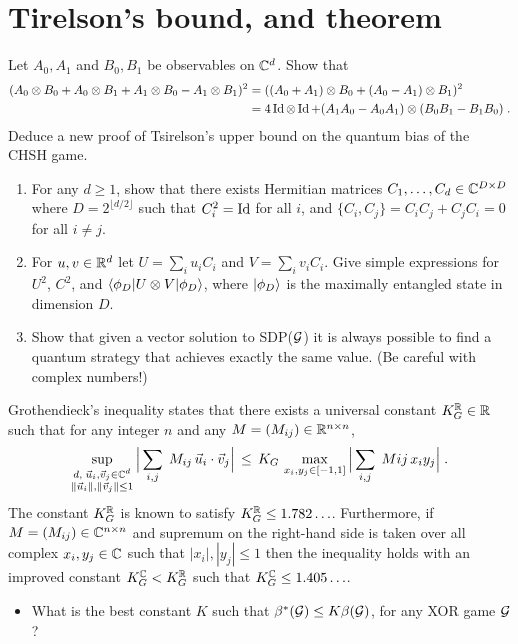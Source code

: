 \section{Tirelson's bound, and theorem}


\begin{exercise}
Let $A_0,A_1$ and $B_0,B_1$ be observables on $\mathbb{C}^d$. Show that
\begin{align}
(A_0\otimes B_0 + A_0\otimes B_1 + A_1\otimes B_0 - A_1\otimes B_1 )^2 &=( (A_0+A_1)\otimes B_0 + (A_0-A_1)\otimes B_1 )^2\label{eq:bellop}\\
&= 4\mathop{\rm Id}\nolimits\otimes \mathop{\rm Id}\nolimits + (A_1A_0-A_0A_1)\otimes (B_0B_1-B_1B_0)\;.\notag
\end{align}
Deduce a new proof of Tsirelson's upper bound on the quantum bias of the CHSH game. 
\end{exercise}

\begin{exercise}\label{ex:tsirelson}
\begin{enumerate}
\item For any $d\geq 1$, show that there exists Hermitian matrices $C_1,\ldots,C_d \in \mathbb{C}^{D\times D}$ where $D=2^{\lfloor d/2\rfloor}$ such that $C_i^2=\mathop{\rm Id}\nolimits$ for all $i$, and $\{C_i,C_j\}=C_iC_j+C_jC_i=0$ for all $i\neq j$.
\item For $u,v \in \mathbb{R}^d$ let $U = \sum_i u_i C_i$ and $V=\sum_i v_i C_i$. Give simple expressions for $U^2$, $C^2$, and $\langle\phi_D| U\otimes V |\phi_D\rangle$, where $|\phi_D\rangle$ is the maximally entangled state in dimension $D$.
\item Show that given a vector solution to SDP($\mathcal{G}$) it is always possible to find a quantum strategy that achieves exactly the same value. (Be careful with complex numbers!)
\end{enumerate}
\end{exercise}

\begin{exercise}
Grothendieck's inequality states that there exists a universal constant $K_G^{\mathbb{R}}\in\mathbb{R}$ such that for any integer $n$ and any $M=(M_{ij})\in \mathbb{R}^{n\times n}$, 
\[\sup_{\substack{d,\;\vec{u}_i,\vec{v}_j\in \mathbb{C}^{d}\\ \|\vec{u}_i\|,\|\vec{v}_j\|\leq 1}} \Big|\sum_{i,j} \; M_{ij}\, \vec{u}_i\cdot \vec{v}_j \Big|\,\leq\, K_G\, \max_{x_i,y_j\in [-1,1]} \Big|\sum_{i,j} \; M{ij}\, x_i y_j \Big|\;.\]
The constant $K_G^{\mathbb{R}}$ is known to satisfy $K_G^{\mathbb{R}} \leq 1.782\ldots$.
Furthermore, if $M=(M_{ij})\in \mathbb{C}^{n\times n}$ and supremum on the right-hand side is taken over all complex $x_i,y_j\in \mathbb{C}$ such that $|x_i|,|y_j|\leq 1$ then the inequality holds with an improved constant $K_G^{\mathbb{C}} < K_G^{\mathbb{R}}$ such that $K_G^{\mathbb{C}} \leq 1.405\ldots$.
\begin{itemize}
\item What is the best constant $K$ such that $\beta^*(\mathcal{G}) \leq K \beta(\mathcal{G})$, for any XOR game $\mathcal{G}$?
\end{itemize}
\end{exercise}



